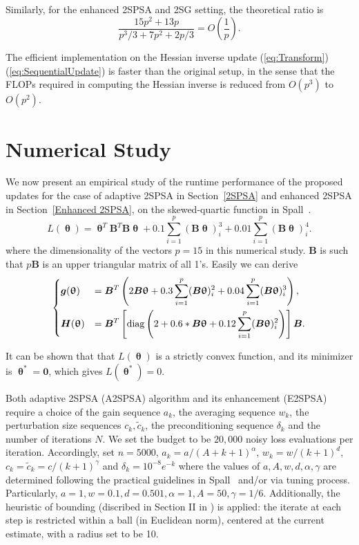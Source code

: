 \documentclass[conference,10.3cpt]{IEEEtran}
\begin{document}
Similarly, for the enhanced 2SPSA and 2SG setting, the theoretical ratio is
\begin{equation}\label{eq:ratio2}
\frac{15p^2+13p}{p^3/3+7p^2+2p/3} = O\left(\frac{1}{p}\right).
\end{equation}

The efficient implementation on the Hessian inverse update (\ref{eq:Transform})\text{--}(\ref{eq:SequentialUpdate}) is faster than the original setup, in the sense that the FLOPs required in computing the Hessian inverse is reduced  from $O(p^3)$ to $O(p^2)$.


\section{Numerical Study} \label{Numerical Study}
We now present an empirical study of the runtime performance of the
proposed updates for the case of adaptive 2SPSA in Section~\ref{2SPSA} and enhanced 2SPSA in Section~\ref{Enhanced 2SPSA}, on the
skewed-quartic function in Spall~\cite{Spall2009}.
\begin{equation*}
  L(\bm{\uptheta})=\bm{\uptheta}^{T}\bm{B}^{T}\bm{B}\bm{\uptheta}+0.1
  \sum_{i=1}^{p} (\bm{B}\bm{\uptheta})_i^3 +0.01 \sum_{i=1}^{p}
  (\bm{B}\bm{\uptheta})_i^4.
\end{equation*}
where the dimensionality of the vectors $p=15$ in this numerical study. $\bm{B}$ is such that $p\bm{B}$ is an
upper triangular matrix of all 1's.
Easily we can derive
\begin{equation}
  \begin{dcases} \bm{g}(\bm{\uptheta})&=\bm{B}^{T}\left(
      2\bm{B}\bm{\uptheta}+0.3 \sum_{i=1}^{p}(\bm{B}\bm{\uptheta})_i^2 +0.04\sum_{i=1}^{p}(\bm{B}\bm{\uptheta})_i^3\right),\\
    \bm{H}(\bm{\uptheta})&=\bm{B}^{T}\left[\text{diag}\left(2+0.6*\bm{B}\bm{\uptheta}+0.12\sum_{i=1}^{p}(\bm{B}\bm{\uptheta})_i^2\right)\right]\bm{B}.\\
  \end{dcases}
\end{equation}

It can be shown that that $L(\bm{\uptheta})$ is a
strictly convex function, and its minimizer is
$\bm{\uptheta}^{*}=\bm{0}$, which gives $L(\bm{\uptheta}^{*})=0$.

Both adaptive 2SPSA (A2SPSA) algorithm and its enhancement (E2SPSA) require a choice of
the gain sequence $a_k$, the averaging sequence $w_k$,
the perturbation size sequences $c_k, \tilde{c}_k$, the preconditioning
sequence $\delta_k$ and the number of iterations $N$. We set the budget to be $20,000$ noisy loss evaluations per iteration. Accordingly, set $n=5000$, $a_k = {a}/{(A + k + 1)^\alpha}$, $w_k = {w}/{(k+1)^d}$, $c_k = \tilde{c}_k = {c}/{(k+1)^\gamma}$ and $\delta_k = 10^{-8}e^{-k}$ where the values of $a, A, w, d, \alpha, \gamma$ are determined following the practical guidelines in Spall~\cite{Spall2000} and/or via tuning process. Particularly, $a=1, w=0.1, d=0.501, \alpha=1, A=50, \gamma=1/6$. Additionally, the heuristic of bounding (discribed in Section II in \cite{Spall2000}) is applied: the iterate at each step is restricted within a ball (in Euclidean norm), centered at the current estimate, with a radius set to be 10.
\end{document}

